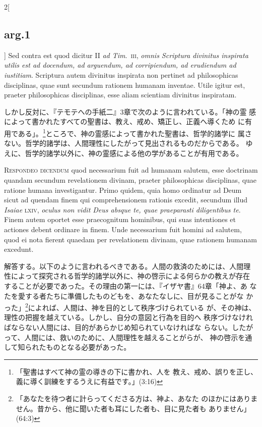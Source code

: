 \documentclass[
paper=a4paper,
fontsize=10pt,
jafontsize=9pt,
titlepage
]{jlreq}
\begin{document}
\begin{paracol}{2}[\subsection{arg.1}]
Sed contra est quod dicitur II {\itshape ad Tim}.~{\scshape iii},
{\itshape omnis Scriptura divinitus inspirata utilis est ad docendum, ad
arguendum, ad corripiendum, ad erudiendum ad iustitiam}. Scriptura autem
divinitus inspirata non pertinet ad philosophicas disciplinas, quae sunt
secundum rationem humanam inventae. Utile igitur est, praeter
philosophicas disciplinas, esse aliam scientiam divinitus inspiratam.

\switchcolumn

しかし反対に、『テモテへの手紙二』3章で次のように言われている。「神の霊
 感によって書かれたすべての聖書は、教え、戒め、矯正し、正義へ導くため
 に有用である」。\footnote{「聖書はすべて神の霊の導きの下に書かれ、人を
 教え、戒め、誤りを正し、義に導く訓練をするうえに有益です。」(3:16)}ところで、神の霊感によって書かれた聖書は、哲学的諸学に
 属さない。哲学的諸学は、人間理性にしたがって見出されるものだからである。
 ゆえに、哲学的諸学以外に、神の霊感による他の学があることが有用である。


{\scshape Respondeo dicendum} quod necessarium fuit ad humanam
salutem, esse doctrinam quandam secundum revelationem divinam, praeter
philosophicas disciplinas, quae ratione humana investigantur. Primo
quidem, quia homo ordinatur ad Deum sicut ad quendam finem qui
comprehensionem rationis excedit, secundum illud {\itshape Isaiae}
{\scshape lxiv}, {\itshape oculus non vidit Deus absque te, quae
praeparasti diligentibus te}. Finem autem oportet esse praecognitum
hominibus, qui suas intentiones et actiones debent ordinare in
finem. Unde necessarium fuit homini ad salutem, quod ei nota fierent
quaedam per revelationem divinam, quae rationem humanam excedunt.

\switchcolumn

解答する。以下のように言われるべきである。人間の救済のためには、人間理
性によって探究される哲学的諸学以外に、神の啓示による何らかの教えが存在
することが必要であった。その理由の第一には、『イザヤ書』64章「神よ、あ
なたを愛する者たちに準備したものどもを、あなたなしに、目が見ることがな
かった」\footnote{「あなたを待つ者に計らってくださる方は、神よ、あなた
のほかにはありません。昔から、他に聞いた者も耳にした者も、目に見た者も
ありません」(64:3)}によれば、人間は、神を目的として秩序づけられている
が、その神は、理性の把握を越えている。しかし、自分の意図と行為を目的へ
秩序づけなければならない人間には、目的があらかじめ知られていなければな
らない。したがって、人間には、救いのために、人間理性を越えることがらが、
神の啓示を通して知られたものとなる必要があった。


\end{paracol}
\end{document}
